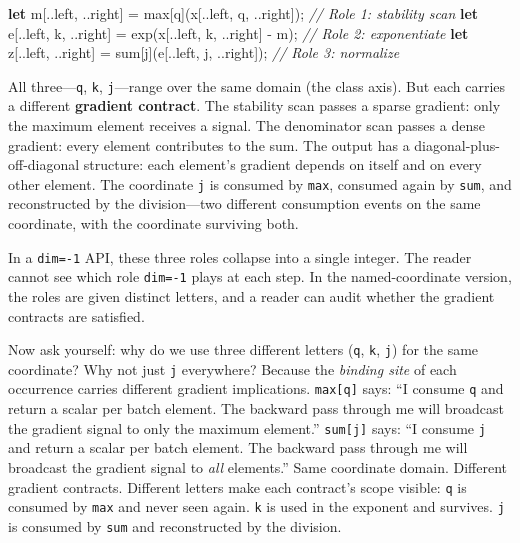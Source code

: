 \documentclass[11pt,titlepage]{article}
\newenvironment{Shaded}{}{}
\newcommand{\CommentTok}[1]{\textcolor[rgb]{0.38,0.63,0.69}{\textit{#1}}}
\newcommand{\KeywordTok}[1]{\textcolor[rgb]{0.00,0.44,0.13}{\textbf{#1}}}
\newcommand{\NormalTok}[1]{#1}
\newcommand{\OperatorTok}[1]{\textcolor[rgb]{0.40,0.40,0.40}{#1}}
\begin{document}
\begin{Shaded}
\begin{Highlighting}[]
\KeywordTok{let}\NormalTok{ m}\OperatorTok{[}\NormalTok{..left, ..right}\OperatorTok{]}\NormalTok{ = max}\OperatorTok{[}\NormalTok{q}\OperatorTok{]}\NormalTok{(x}\OperatorTok{[}\NormalTok{..left, q, ..right}\OperatorTok{]}\NormalTok{);    }\CommentTok{// Role 1: stability scan}
\KeywordTok{let}\NormalTok{ e}\OperatorTok{[}\NormalTok{..left, k, ..right}\OperatorTok{]}\NormalTok{ = exp(x}\OperatorTok{[}\NormalTok{..left, k, ..right}\OperatorTok{]}\NormalTok{ - m); }\CommentTok{// Role 2: exponentiate}
\KeywordTok{let}\NormalTok{ z}\OperatorTok{[}\NormalTok{..left, ..right}\OperatorTok{]}\NormalTok{ = sum}\OperatorTok{[}\NormalTok{j}\OperatorTok{]}\NormalTok{(e}\OperatorTok{[}\NormalTok{..left, j, ..right}\OperatorTok{]}\NormalTok{);     }\CommentTok{// Role 3: normalize}
\end{Highlighting}
\end{Shaded}

All three---\texttt{q}, \texttt{k}, \texttt{j}---range over the same
domain (the class axis). But each carries a different \textbf{gradient
contract}. The stability scan passes a sparse gradient: only the maximum
element receives a signal. The denominator scan passes a dense gradient:
every element contributes to the sum. The output has a
diagonal-plus-off-diagonal structure: each element's gradient depends on
itself and on every other element. The coordinate \texttt{j} is consumed
by \texttt{max}, consumed again by \texttt{sum}, and reconstructed by
the division---two different consumption events on the same coordinate,
with the coordinate surviving both.

In a \texttt{dim=-1} API, these three roles collapse into a single
integer. The reader cannot see which role \texttt{dim=-1} plays at each
step. In the named-coordinate version, the roles are given distinct
letters, and a reader can audit whether the gradient contracts are
satisfied.

Now ask yourself: why do we use three different letters (\texttt{q},
\texttt{k}, \texttt{j}) for the same coordinate? Why not just \texttt{j}
everywhere? Because the \emph{binding site} of each occurrence carries
different gradient implications. \texttt{max{[}q{]}} says: ``I consume
\texttt{q} and return a scalar per batch element. The backward pass
through me will broadcast the gradient signal to only the maximum
element.'' \texttt{sum{[}j{]}} says: ``I consume \texttt{j} and return a
scalar per batch element. The backward pass through me will broadcast
the gradient signal to \emph{all} elements.'' Same coordinate domain.
Different gradient contracts. Different letters make each contract's
scope visible: \texttt{q} is consumed by \texttt{max} and never seen
again. \texttt{k} is used in the exponent and survives. \texttt{j} is
consumed by \texttt{sum} and reconstructed by the division.
\end{document}
